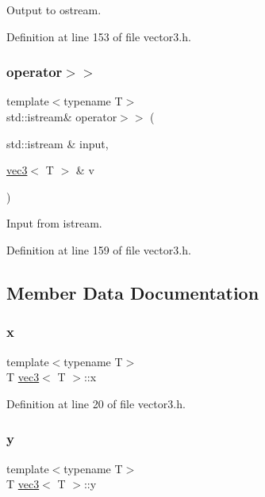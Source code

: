 Output to ostream. 



Definition at line 153 of file vector3.\+h.

\mbox{\label{structvec3_a72f92578884bd68e0747871acd8545fd}} 
\subsubsection{\texorpdfstring{operator$>$$>$}{operator>>}}
{\footnotesize\ttfamily template$<$typename T$>$ \\
std\+::istream\& operator$>$$>$ (\begin{DoxyParamCaption}\item[{std\+::istream \&}]{input,  }\item[{\mbox{\hyperlink{structvec3}{vec3}}$<$ T $>$ \&}]{v }\end{DoxyParamCaption})\hspace{0.3cm}{\ttfamily [friend]}}



Input from istream. 



Definition at line 159 of file vector3.\+h.



\subsection{Member Data Documentation}
\mbox{\label{structvec3_a3f1f0c60e13b8bf67f64b1afc9cd6d1a}} 
\subsubsection{\texorpdfstring{x}{x}}
{\footnotesize\ttfamily template$<$typename T$>$ \\
T \mbox{\hyperlink{structvec3}{vec3}}$<$ T $>$\+::x}



Definition at line 20 of file vector3.\+h.

\mbox{\label{structvec3_a77c2f238c0b2b7895304f5ca64b8d770}} 
\subsubsection{\texorpdfstring{y}{y}}
{\footnotesize\ttfamily template$<$typename T$>$ \\
T \mbox{\hyperlink{structvec3}{vec3}}$<$ T $>$\+::y}



